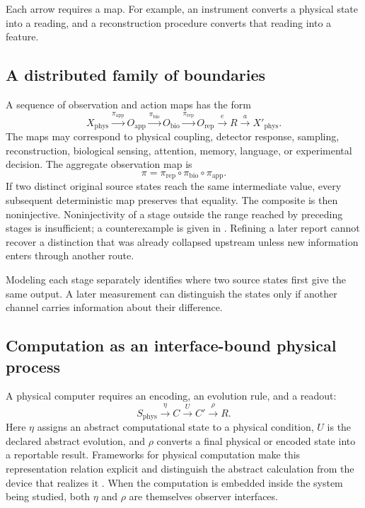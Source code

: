 Each arrow requires a map. For example, an instrument converts a physical state into a reading, and a reconstruction procedure converts that reading into a feature.

\subsection{A distributed family of boundaries}

A sequence of observation and action maps has the form
\[
X_{\mathrm{phys}}
\xrightarrow{\pi_{\mathrm{app}}}
O_{\mathrm{app}}
\xrightarrow{\pi_{\mathrm{bio}}}
O_{\mathrm{bio}}
\xrightarrow{\pi_{\mathrm{rep}}}
O_{\mathrm{rep}}
\xrightarrow{e}
R
\xrightarrow{a}
X'_{\mathrm{phys}}.
\]
The maps may correspond to physical coupling, detector response, sampling, reconstruction, biological sensing, attention, memory, language, or experimental decision. The aggregate observation map is
\[
\pi=\pi_{\mathrm{rep}}\circ\pi_{\mathrm{bio}}\circ\pi_{\mathrm{app}}.
\]
If two distinct original source states reach the same intermediate value, every subsequent deterministic map preserves that equality. The composite is then noninjective. Noninjectivity of a stage outside the range reached by preceding stages is insufficient; a counterexample is given in . Refining a later report cannot recover a distinction that was already collapsed upstream unless new information enters through another route.

Modeling each stage separately identifies where two source states first give the same output. A later measurement can distinguish the states only if another channel carries information about their difference.


\subsection{Computation as an interface-bound physical process}

A physical computer requires an encoding, an evolution rule, and a readout:
\[
S_{\mathrm{phys}}
\xrightarrow{\eta}
C
\xrightarrow{U}
C'
\xrightarrow{\rho}
R.
\]
Here \(\eta\) assigns an abstract computational state to a physical condition, \(U\) is the declared abstract evolution, and \(\rho\) converts a final physical or encoded state into a reportable result. Frameworks for physical computation make this representation relation explicit and distinguish the abstract calculation from the device that realizes it \parencite{Horsman2014,Horsman2015}. When the computation is embedded inside the system being studied, both \(\eta\) and \(\rho\) are themselves observer interfaces.

